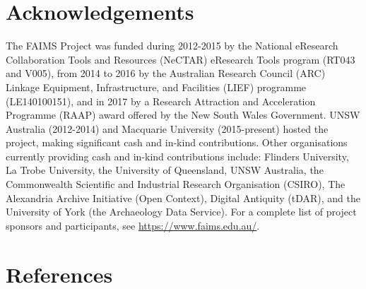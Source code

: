 \documentclass[preprint,12pt, a4paper]{elsarticle}
\begin{document}
\appendix


\section*{Acknowledgements}
\label{}

The FAIMS Project was funded during 2012-2015 by the National eResearch Collaboration Tools and Resources (NeCTAR) eResearch Tools program (RT043 and V005), from 2014 to 2016 by the Australian Research Council (ARC) Linkage Equipment, Infrastructure, and Facilities (LIEF) programme (LE140100151), and in 2017 by a Research Attraction and Acceleration Programme (RAAP) award offered by the New South Wales Government. UNSW Australia (2012-2014) and Macquarie University (2015-present) hosted the project, making significant cash and in-kind contributions. Other organisations currently providing cash and in-kind contributions include: Flinders University, La Trobe University, the University of Queensland, UNSW Australia, the Commonwealth Scientific and Industrial Research Organisation (CSIRO), The Alexandria Archive Initiative (Open Context), Digital Antiquity (tDAR), and the University of York (the Archaeology Data Service). For a complete list of project sponsors and participants, see \url{https://www.faims.edu.au/}. 

\section*{References}
\label{}

 






\end{document}
